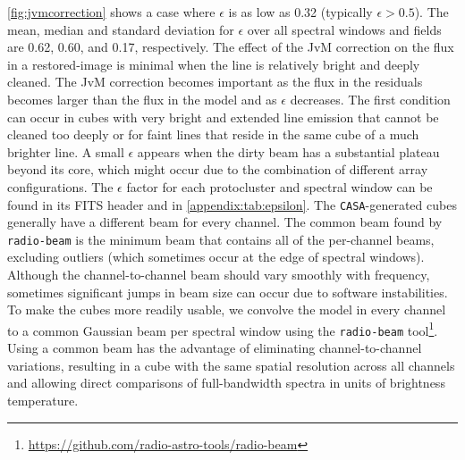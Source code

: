 \documentclass[longauth]{aa} %
\begin{document}
\cref{fig:jvmcorrection} shows a case where $\epsilon$ is as low as 0.32 (typically $\epsilon > 0.5$). The mean, median and standard deviation for $\epsilon$ over all spectral windows and fields are 0.62, 0.60, and 0.17, respectively. The effect of the JvM correction on the flux in a restored-image is minimal when the line is relatively bright and  deeply cleaned. The JvM correction becomes important as the flux in the residuals becomes larger than the flux in the model and as $\epsilon$ decreases. The first condition can occur in cubes with very bright and extended line emission that cannot be cleaned too deeply or for faint lines that reside in the same cube of a much brighter line. A small $\epsilon$ appears when the dirty beam has a substantial plateau beyond its core, which might occur due to the combination of different array configurations. The $\epsilon$ factor for each protocluster and spectral window can be found in its FITS header and in  \cref{appendix:tab:epsilon}.   
The \texttt{CASA}-generated cubes generally have a different beam for every channel. 
The common beam found by \texttt{radio-beam} is the minimum beam that contains all of the per-channel beams, excluding outliers (which sometimes occur at the edge of spectral windows). Although the channel-to-channel beam should vary smoothly with frequency, sometimes significant jumps in beam size can occur due to software instabilities. 
To make the cubes more readily usable, we convolve the model in every channel to a common Gaussian beam per spectral window using the \texttt{radio-beam} tool\footnote{\url{https://github.com/radio-astro-tools/radio-beam}}.
Using a common beam has the advantage of eliminating channel-to-channel variations, resulting in a cube with the same spatial resolution across all channels and allowing direct comparisons of full-bandwidth spectra in units of brightness temperature. 
  
\end{document}
